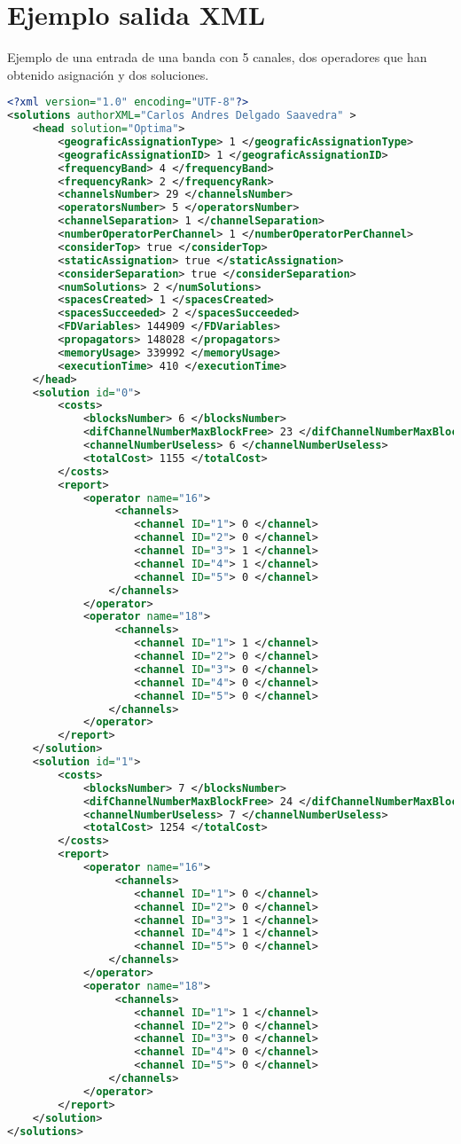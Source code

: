 \section*{Ejemplo salida XML} \label{ejemploSalida}
Ejemplo de una entrada de una banda con 5 canales, dos operadores que han obtenido asignación y dos soluciones.

\lstset{frameround=fttt}
\begin{lstlisting}[frame=trBL, language=XML]
<?xml version="1.0" encoding="UTF-8"?>
<solutions authorXML="Carlos Andres Delgado Saavedra" >
	<head solution="Optima">
		<geograficAssignationType> 1 </geograficAssignationType>
		<geograficAssignationID> 1 </geograficAssignationID>
		<frequencyBand> 4 </frequencyBand>
		<frequencyRank> 2 </frequencyRank>
		<channelsNumber> 29 </channelsNumber>
		<operatorsNumber> 5 </operatorsNumber>
		<channelSeparation> 1 </channelSeparation>
		<numberOperatorPerChannel> 1 </numberOperatorPerChannel>
		<considerTop> true </considerTop>
		<staticAssignation> true </staticAssignation>
		<considerSeparation> true </considerSeparation>
		<numSolutions> 2 </numSolutions>
		<spacesCreated> 1 </spacesCreated>
		<spacesSucceeded> 2 </spacesSucceeded>
		<FDVariables> 144909 </FDVariables>
		<propagators> 148028 </propagators>
		<memoryUsage> 339992 </memoryUsage>
		<executionTime> 410 </executionTime>
	</head>
	<solution id="0">
		<costs>
			<blocksNumber> 6 </blocksNumber>
			<difChannelNumberMaxBlockFree> 23 </difChannelNumberMaxBlockFree>
			<channelNumberUseless> 6 </channelNumberUseless>
			<totalCost> 1155 </totalCost>
		</costs>
		<report>
			<operator name="16">
				 <channels>
					<channel ID="1"> 0 </channel>
					<channel ID="2"> 0 </channel>
					<channel ID="3"> 1 </channel>
					<channel ID="4"> 1 </channel>
					<channel ID="5"> 0 </channel>
				</channels>
			</operator>
			<operator name="18">
				 <channels>
					<channel ID="1"> 1 </channel>
					<channel ID="2"> 0 </channel>
					<channel ID="3"> 0 </channel>
					<channel ID="4"> 0 </channel>
					<channel ID="5"> 0 </channel>
				</channels>
			</operator>
		</report>
	</solution>
	<solution id="1">
		<costs>
			<blocksNumber> 7 </blocksNumber>
			<difChannelNumberMaxBlockFree> 24 </difChannelNumberMaxBlockFree>
			<channelNumberUseless> 7 </channelNumberUseless>
			<totalCost> 1254 </totalCost>
		</costs>
		<report>
			<operator name="16">
				 <channels>
					<channel ID="1"> 0 </channel>
					<channel ID="2"> 0 </channel>
					<channel ID="3"> 1 </channel>
					<channel ID="4"> 1 </channel>
					<channel ID="5"> 0 </channel>
				</channels>
			</operator>
			<operator name="18">
				 <channels>
					<channel ID="1"> 1 </channel>
					<channel ID="2"> 0 </channel>
					<channel ID="3"> 0 </channel>
					<channel ID="4"> 0 </channel>
					<channel ID="5"> 0 </channel>
				</channels>
			</operator>
		</report>
	</solution>
</solutions>
\end{lstlisting}
